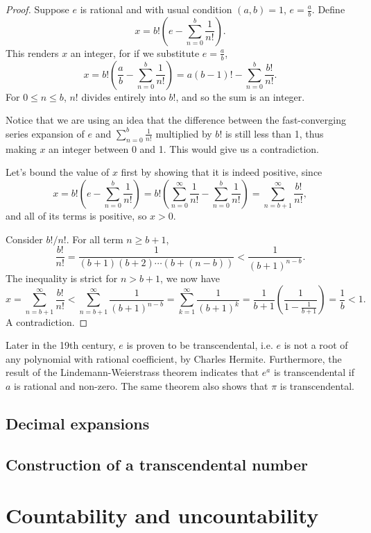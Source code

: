 \documentclass[main.tex]{subfiles}
\begin{document}
		\begin{proof}
			Suppose $e$ is rational and with usual condition $(a,b) = 1$, $e = \frac{a}{b}$. Define
			\begin{equation}
				x = b!\left(e - \sum_{n = 0}^{b} \frac{1}{n!}\right).
			\end{equation}
			This renders $x$ an integer, for if we substitute $e = \frac{a}{b}$,
			\begin{equation*}
				x = b!\left(\frac{a}{b} - \sum_{n = 0}^{b} \frac{1}{n!}\right) = a(b - 1)! - \sum_{n = 0}^{b} \frac{b!}{n!}.
			\end{equation*}
			For $0 \leq n \leq b$, $n!$ divides entirely into $b!$, and so the sum is an integer.
			
			Notice that we are using an idea that the difference between the fast-converging series expansion of $e$ and $\sum_{n = 0}^{b} \frac{1}{n!}$ multiplied by $b!$ is still less than 1, thus making $x$ an integer between 0 and 1. This would give us a contradiction.
			
			Let's bound the value of $x$ first by showing that it is indeed positive, since
			\begin{equation}
			x = b!\left(e - \sum_{n = 0}^{b} \frac{1}{n!}\right) = b!\left(\sum_{n = 0}^{\infty} \frac{1}{n!} - \sum_{n = 0}^{b} \frac{1}{n!}\right) = \sum_{n = b + 1}^{\infty} \frac{b!}{n!},
			\end{equation}
			and all of its terms is positive, so $x > 0$.
			
			Consider ${b!}/{n!}$. For all term $n \geq b + 1$,
			\begin{equation*}
				\frac{b!}{n!} = \frac{1}{(b + 1)(b + 2)\cdots(b + (n - b))} < \frac{1}{(b + 1)^{n - b}}.
			\end{equation*}
			The inequality is strict for $n > b + 1$, we now have
			\begin{equation}
				x = \sum_{n = b + 1}^{\infty} \frac{b!}{n!} < \sum_{n = b + 1}^{\infty} \frac{1}{(b + 1)^{n - b}} = \sum_{k = 1}^{\infty} \frac{1}{(b + 1)^{k}} = \frac{1}{b + 1}\left(\frac{1}{1 - \frac{1}{b + 1}}\right) = \frac{1}{b} < 1.
			\end{equation}
			A contradiction.
		\end{proof}
		Later in the 19th century, $e$ is proven to be transcendental, i.e. $e$ is not a root of any polynomial with rational coefficient, by Charles Hermite. Furthermore, the result of the Lindemann-Weierstrass theorem indicates that $e^a$ is transcendental if $a$ is rational and non-zero. The same theorem also shows that $\pi$ is transcendental.
		
		\subsection{Decimal expansions}
			
		\subsection{Construction of a transcendental number}
		
	\section{Countability and uncountability}
		
	
\end{document}
